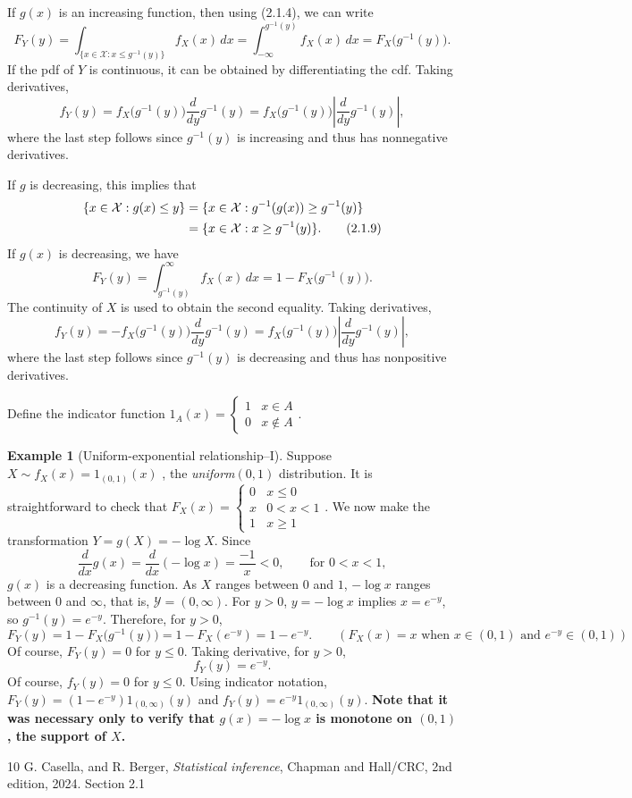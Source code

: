 \documentclass{article}
\theoremstyle{plain}
\theoremstyle{definition}
\newtheorem{exa}[thm]{Example}
\begin{document}
If $g(x)$ is an increasing function, then using (2.1.4), we can write
\[
F_Y(y)
= \int_{\{x\in\mathcal{X}: x\le g^{-1}(y)\}} f_X(x)\,dx
= \int_{-\infty}^{g^{-1}(y)} f_X(x)\,dx
= F_X\bigl(g^{-1}(y)\bigr).
\]
If the pdf of $Y$ is continuous, it can be obtained by differentiating the cdf. Taking derivatives,
\[
f_Y(y)
= f_X\bigl(g^{-1}(y)\bigr) \frac{d}{dy}g^{-1}(y) = f_X\bigl(g^{-1}(y)\bigr) \left|\frac{d}{dy}g^{-1}(y)\right|,
\]
where the last step follows since $g^{-1}(y)$ is increasing and thus has nonnegative derivatives.

If $g$ is decreasing, this implies that
\begin{align}
\{x\in\mathcal{X}: g(x)\le y\}
&= \{x\in\mathcal{X}: g^{-1}(g(x)) \ge g^{-1}(y)\} \notag\\
&= \{x\in\mathcal{X}: x \ge g^{-1}(y)\}.
\tag{2.1.9}
\end{align}
If $g(x)$ is decreasing, we have
\[
F_Y(y)
= \int_{g^{-1}(y)}^{\infty} f_X(x)\,dx
= 1 - F_X\bigl(g^{-1}(y)\bigr).
\]
The continuity of $X$ is used to obtain the second equality. Taking derivatives,
\[
f_Y(y)
= -f_X\bigl(g^{-1}(y)\bigr) \frac{d}{dy}g^{-1}(y) = f_X\bigl(g^{-1}(y)\bigr) \left|\frac{d}{dy}g^{-1}(y)\right|,
\]
where the last step follows since $g^{-1}(y)$ is decreasing and thus has nonpositive derivatives.

Define the indicator function $1_A(x) = \begin{cases} 1 & x\in A\\ 0 & x\not\in A \end{cases}$. 

\begin{exa}[Uniform-exponential relationship--I] \quad
Suppose $X\sim f_X(x)=1_{(0,1)}(x)$ , the \emph{uniform}$(0,1)$
distribution. It is straightforward to check that $F_X(x)=\begin{cases}  0 & x\leq 0 \\
x & 0<x<1 \\  1 & x\geq 1 \end{cases} $.
We now make the transformation $Y=g(X)=-\log X$. Since
\[
\frac{d}{dx}g(x)=\frac{d}{dx}(-\log x)=\frac{-1}{x}<0,
\qquad \text{for } 0<x<1,
\]
$g(x)$ is a decreasing function. As $X$ ranges between $0$ and $1$, $-\log x$ ranges
between $0$ and $\infty$, that is, $\mathcal{Y}=(0,\infty)$. For $y>0$, $y=-\log x$
implies $x=e^{-y}$, so $g^{-1}(y)=e^{-y}$. Therefore, for $y>0$,
\[
F_Y(y)=1-F_X\bigl(g^{-1}(y)\bigr)=1-F_X(e^{-y})=1-e^{-y}.
\qquad (F_X(x)=x  \text{ when } x\in (0,1) \text{ and } e^{-y}\in (0,1) )
\]
Of course, $F_Y(y)=0$ for $y\le 0$.  Taking derivative, for $y>0$,
\[
f_Y(y)=e^{-y}.
\]
Of course, $f_Y(y)=0$ for $y\le 0$. Using indicator notation, $F_Y(y) = (1-e^{-y}) 1_{(0,\infty)}(y) $ and $f_Y(y) = e^{-y} 1_{(0,\infty)}(y) $.  \textbf{Note that it was necessary only to verify that
$g(x)=-\log x$ is monotone on $(0,1)$, the support of $X$.}
\end{exa}








\begin{thebibliography}{10}
G. Casella,  and R. Berger,
{\it Statistical inference}, Chapman and Hall/CRC, 2nd edition, 2024.  Section 2.1
\end{thebibliography}
\end{document}
